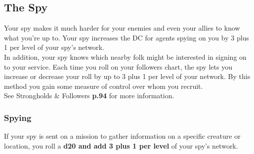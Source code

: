 \documentclass[letterpaper,10pt,twoside,twocolumn,openany]{book}
\begin{document}
\subsection{The Spy}

Your spy makes it much harder for your enemies and even your allies to know what you’re up to. Your spy increases the DC for agents spying on you by 3 plus 1 per level of your spy’s network.\\
In addition, your spy knows which nearby folk might be interested in signing on to your service. Each time you roll on your followers chart, the spy lets you increase or decrease your roll by up to 3 plus 1 per level of your network. By this method you gain some measure of control over whom you recruit.\\
See Strongholds \& Followers \textbf{p.94} for more information.

\subsubsection{Spying}

If your spy is sent on a mission to gather information on a specific creature or location, you roll a \textbf{d20 and add 3 plus 1 per level} of your spy's network.

\endgroup

\end{document}
